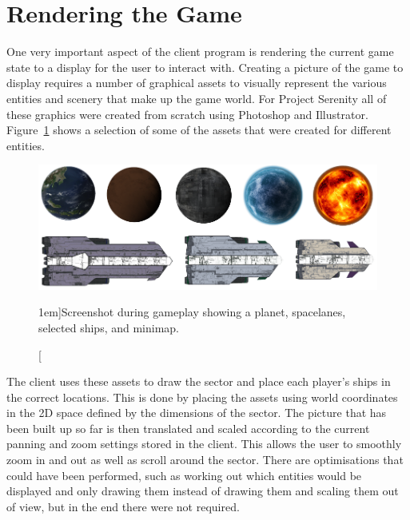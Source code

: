 \section{Rendering the Game}

One very important aspect of the client program is rendering the current game state to a display for the user to interact with. Creating a picture of the game to display requires a number of graphical assets to visually represent the various entities and scenery that make up the game world. For Project Serenity all of these graphics were created from scratch using Photoshop and Illustrator. Figure~\ref{fig:textures} shows a selection of some of the assets that were created for different entities.

\begin{figure}[h!]
	\includegraphics{res/serenityscreens/textures.png}
	\caption[][1em]{Screenshot during gameplay showing a planet, spacelanes, selected ships, and minimap.}
	\label{fig:textures}
\end{figure}

The client uses these assets to draw the sector and place each player's ships in the correct locations. This is done by placing the assets using world coordinates in the 2D space defined by the dimensions of the sector. The picture that has been built up so far is then translated and scaled according to the current panning and zoom settings stored in the client. This allows the user to smoothly zoom in and out as well as scroll around the sector. There are optimisations that could have been performed, such as working out which entities would be displayed and only drawing them instead of drawing them and scaling them out of view, but in the end there were not required.


